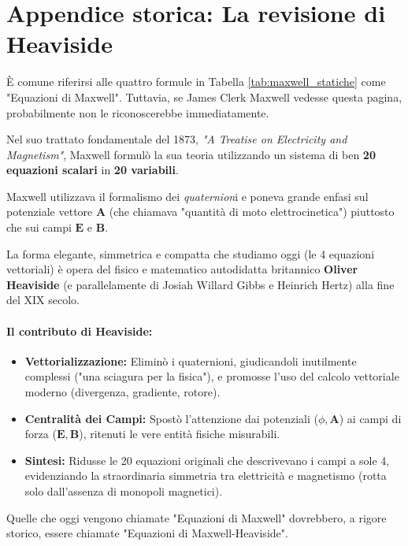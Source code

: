 \documentclass[a4paper,11pt]{report}
\begin{document}
\section{Appendice storica: La revisione di Heaviside}

È comune riferirsi alle quattro formule in Tabella \ref{tab:maxwell_statiche} come "Equazioni di Maxwell". Tuttavia, se James Clerk Maxwell vedesse questa pagina, probabilmente non le riconoscerebbe immediatamente.

\begin{approfondimento}[colback=white, colframe=black!70, no shadow,  title=Dai Quaterioni ai Vettori: il ruolo di Oliver Heaviside]
    Nel suo trattato fondamentale del 1873, \textit{"A Treatise on Electricity and Magnetism"}, Maxwell formulò la sua teoria utilizzando un sistema di ben \textbf{20 equazioni scalari} in \textbf{20 variabili}.
    
    Maxwell utilizzava il formalismo dei \textit{quaternion}i e poneva grande enfasi sul potenziale vettore $\bm{A}$ (che chiamava "quantità di moto elettrocinetica") piuttosto che sui campi $\bm{E}$ e $\bm{B}$.
    
    La forma elegante, simmetrica e compatta che studiamo oggi (le 4 equazioni vettoriali) è opera del fisico e matematico autodidatta britannico \textbf{Oliver Heaviside} (e parallelamente di Josiah Willard Gibbs e Heinrich Hertz) alla fine del XIX secolo.
    
    \paragraph{Il contributo di Heaviside:}
    \begin{itemize}
        \item \textbf{Vettorializzazione:} Eliminò i quaternioni, giudicandoli inutilmente complessi ("una sciagura per la fisica"), e promosse l'uso del calcolo vettoriale moderno (divergenza, gradiente, rotore).
        \item \textbf{Centralità dei Campi:} Spostò l'attenzione dai potenziali ($\phi, \bm{A}$) ai campi di forza ($\bm{E}, \bm{B}$), ritenuti le vere entità fisiche misurabili.
        \item \textbf{Sintesi:} Ridusse le 20 equazioni originali che descrivevano i campi a sole 4, evidenziando la straordinaria simmetria tra elettricità e magnetismo (rotta solo dall'assenza di monopoli magnetici).
    \end{itemize}
    
    Quelle che oggi vengono chiamate "Equazioni di Maxwell" dovrebbero, a rigore storico, essere chiamate "Equazioni di Maxwell-Heaviside".
\end{approfondimento}
\end{document}
